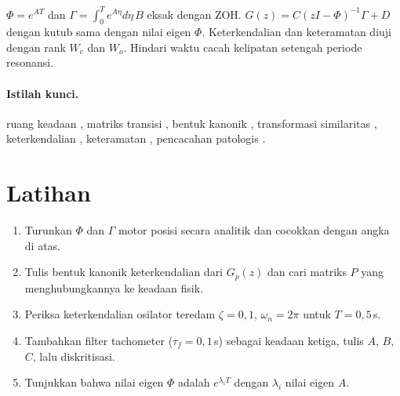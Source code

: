 \begin{ringkasan}
	$\Phi = e^{AT}$ dan $\Gamma = \int_0^Te^{A\eta}d\eta\,B$ eksak dengan ZOH. $G(z) = C(zI-\Phi)^{-1}\Gamma + D$ dengan kutub sama dengan nilai eigen $\Phi$. Keterkendalian dan keteramatan diuji dengan rank $W_c$ dan $W_o$. Hindari waktu cacah kelipatan setengah periode resonansi.\\[3pt]
\end{ringkasan}

\paragraph{Istilah kunci.} ruang keadaan , matriks transisi , bentuk kanonik , transformasi similaritas , keterkendalian , keteramatan , pencacahan patologis .

\section*{Latihan}
\begin{enumerate}
	\item Turunkan $\Phi$ dan $\Gamma$ motor posisi secara analitik dan cocokkan dengan angka di atas.
	\item Tulis bentuk kanonik keterkendalian dari $G_p(z)$ dan cari matriks $P$ yang menghubungkannya ke keadaan fisik.
	\item Periksa keterkendalian osilator teredam $\zeta = 0{,}1$, $\omega_n = 2\pi$ untuk $T = 0{,}5$\,s.
	\item Tambahkan filter tachometer ($\tau_f = 0{,}1$\,s) sebagai keadaan ketiga, tulis $A$, $B$, $C$, lalu diskritisasi.
	\item Tunjukkan bahwa nilai eigen $\Phi$ adalah $e^{\lambda_iT}$ dengan $\lambda_i$ nilai eigen $A$.
\end{enumerate}
